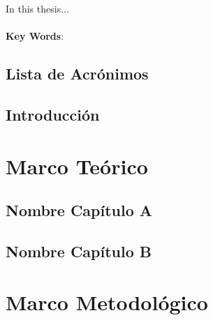 \documentclass[12pt,A4paper,titlepage, twoside, openright]{report}
\begin{document}
In this thesis...
\\
\\
\textbf{Key Words}: 


\tableofcontents %
\listoftables %
\listoffigures %


\chapter*{Lista de Acrónimos}

\clearpage	

 
 
\chapter{Introducción}
\label{ch:intro}


 
\part{Marco Teórico}
	\chapter{Nombre Capítulo A}
	\label{ch:nombre_capitulo_a}
%	
	
	\chapter{Nombre Capítulo B}
	\label{ch:nombre_capitulo_b}
%	

\part{Marco Metodológico}
\end{document}
